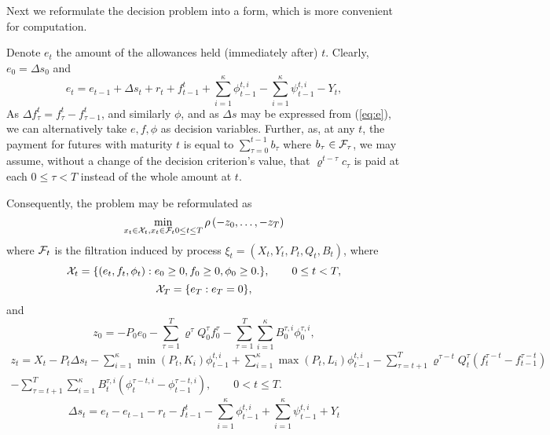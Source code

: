\documentclass[3p,times]{elsarticle}
\begin{document}
Next we reformulate the decision problem into a form, which is more convenient for computation. 

Denote $e_t$ the amount of the allowances held (immediately after) $t$. Clearly, $e_0=\Delta s_0$ and 
\begin{equation}\label{eq:e}
e_t = e_{t-1}+\Delta s_t+r_t +
f_{t-1}^t
+\sum_{i=1}^{\kappa}\phi_{t-1}^{t,i}
-\sum_{i=1}^{\kappa}\psi_{t-1}^{t,i}
-Y_t,
\end{equation}
As $\Delta f^t_\tau=f^t_\tau-f^t_{\tau-1}$, and similarly $\phi$, and as $\Delta s$ may be expressed from (\ref{eq:e}), we can alternatively take $e,f,\phi$ as decision variables. Further, as, at any $t$, the payment for futures with maturity $t$ is equal to $\sum_{\tau=0}^{t-1} b_\tau$ where $b_\tau \in  \mathcal{F}_\tau$, we may assume, without a change of the decision criterion's value, that $\varrho^{t-\tau}c_\tau$ is paid at each $0\leq \tau < T$ instead of the whole amount at $t$.

Consequently, the problem may be reformulated as
\[
\min_{x_{t}\in\mathcal{X}_{t},x_t \in \mathcal{F}_t 0\leq t\leq T}\rho\left(-z_{0},\dots,-z_{T}\right)
\]
where $\mathcal{F}_t$ is the filtration induced by process
$\xi_{t}=(X_{t},Y_{t},P_{t},Q_{t},B_t)$, where
$$
\mathcal{X}_{t}=\{(e_{t}, f_{t},\phi_{t}): e_0 \geq 0, f_0\geq0,
\phi_{0} \geq0.\},\qquad 0\leq t < T,$$
$$
\mathcal{X}_T = \{e_T:e_T=0\},
$$
and
$$
z_0=-P_0e_0-\sum_{\tau=1}^{T}\varrho^{\tau}Q_0^{\tau} f_0^{\tau}-  \sum_{\tau=1}^{T}\sum_{i=1}^{\kappa}B_0^{\tau,i}\phi_0^{\tau,i}, 
$$
\begin{multline*}
z_t  =X_t-P_t \Delta s_t
-\sum_{i=1}^{\kappa}\min(P_t,K_{i})\phi_{t-1}^{t,i}
+\sum_{i=1}^{\kappa}\max(P_t,L_{i})\phi_{t-1}^{t,i}
-\sum_{\tau=t+1}^{T}\varrho^{\tau-t}Q_t^{\tau}(f_t^{\tau-t}
-f_{t-1}^{\tau-t})
\\-\sum_{\tau=t+1}^{T}\sum_{i=1}^{\kappa}B_t^{\tau,i}
(\phi_t^{\tau-t,i}-\phi_{t-1}^{\tau-t,i}),\qquad 0<t\leq T.
\end{multline*}
$$
\Delta s_t = e_t -e_{t-1}-r_t-
f_{t-1}^t
-\sum_{i=1}^{\kappa}\phi_{t-1}^{t,i}
+\sum_{i=1}^{\kappa}\psi_{t-1}^{t,i}
+Y_t
$$
\end{document}
